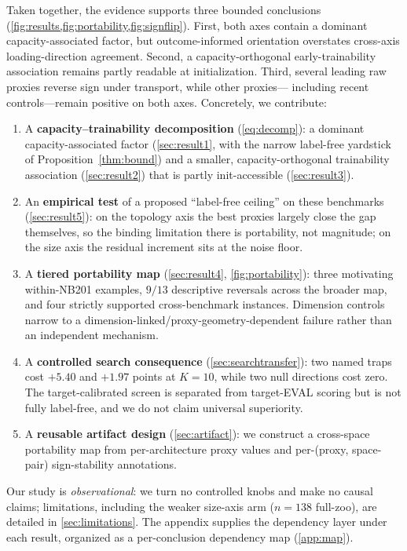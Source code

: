 Taken together, the evidence supports three bounded conclusions
(\cref{fig:results,fig:portability,fig:signflip}). First, both axes contain a
dominant capacity-associated factor, but outcome-informed orientation overstates
cross-axis loading-direction agreement. Second, a capacity-orthogonal
early-trainability association remains partly readable at initialization. Third,
several leading raw proxies reverse sign under transport, while other proxies---
including recent controls---remain positive on both axes. Concretely, we
contribute:
\begin{enumerate}\itemsep2pt
\item A \textbf{capacity--trainability decomposition} (\cref{eq:decomp}): a
dominant capacity-associated factor (\cref{sec:result1}, with the narrow
label-free yardstick of Proposition~\ref{thm:bound}) and a smaller,
capacity-orthogonal trainability association (\cref{sec:result2}) that is partly
init-accessible (\cref{sec:result3}).
\item An \textbf{empirical test} of a proposed ``label-free ceiling'' on these
benchmarks (\cref{sec:result5}): on the topology axis the best proxies largely close
the gap themselves, so the binding limitation there is portability, not magnitude;
on the size axis the residual increment sits at the noise floor.
\item A \textbf{tiered portability map} (\cref{sec:result4},
\cref{fig:portability}): three motivating within-NB201 examples, $9/13$
descriptive reversals across the broader map, and four strictly supported
cross-benchmark instances. Dimension controls narrow  to a
dimension-linked/proxy-geometry-dependent failure rather than an independent
mechanism.
\item A \textbf{controlled search consequence} (\cref{sec:searchtransfer}): two
named traps cost $+5.40$ and $+1.97$ points at $K{=}10$, while two null
directions cost zero. The target-calibrated screen is separated from target-EVAL
scoring but is not fully label-free, and we do not claim universal superiority.
\item A \textbf{reusable artifact design} (\cref{sec:artifact}): we construct a
cross-space portability map from per-architecture proxy values and
per-(proxy, space-pair) sign-stability annotations.
\end{enumerate}

\noindent Our study is \emph{observational}: we turn no controlled knobs and make
no causal claims; limitations, including the weaker size-axis arm ($n{=}138$
full-zoo), are detailed in \cref{sec:limitations}. The appendix supplies the
dependency layer under each result, organized as a per-conclusion dependency map
(\cref{app:map}).
